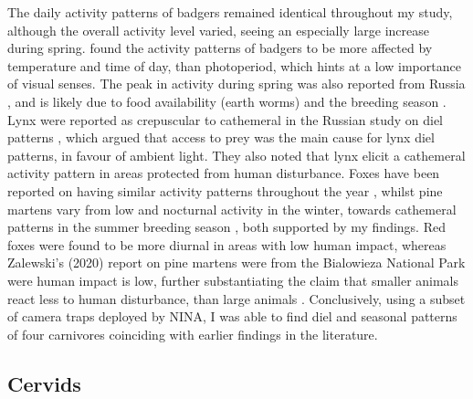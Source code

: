 The daily activity patterns of badgers remained identical throughout my study, although the overall activity level varied, seeing an especially large increase during spring. 
\textcite{LauraCab2020} found the activity patterns of badgers to be more affected by temperature and time of day, than photoperiod, which hints at a low importance of visual senses. The peak in activity during spring was also reported from Russia \autocite{Ogurtsov2018}, and is likely due to food availability (earth worms) and the breeding season \autocite{LauraCab2020}.
Lynx were reported as crepuscular to cathemeral in the Russian study on diel patterns \autocite{Ogurtsov2018}, which argued that access to prey was the main cause for lynx diel patterns, in favour of ambient light. They also noted that lynx elicit a cathemeral activity pattern in areas protected from human disturbance.
Foxes have been reported on having similar activity patterns throughout the year \autocite{Ikeda2016}, whilst pine martens vary from low and nocturnal activity in the winter, towards cathemeral patterns in the summer breeding season \autocite{Zalewski2000}, both supported by my findings.
Red foxes were found to be more diurnal in areas with low human impact, whereas Zalewski's (2020) report on pine martens were from the Bialowieza National Park were human impact is low, further substantiating the claim that smaller animals react less to human disturbance, than large animals \autocite{Gaynor2018}.
Conclusively, using a subset of camera traps deployed by NINA, I was able to find diel and seasonal patterns of four carnivores coinciding with earlier findings in the literature.

\subsection{Cervids}

